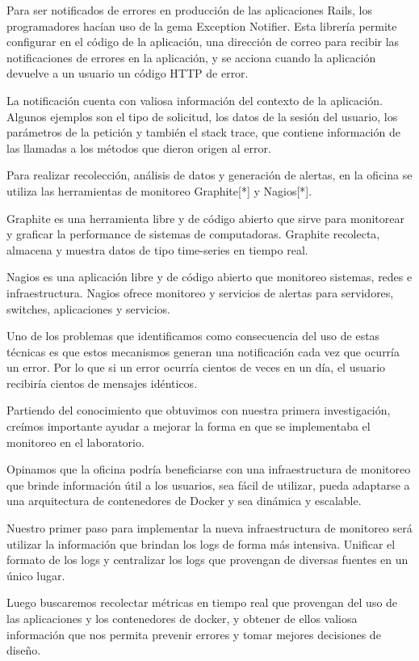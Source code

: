 Para ser notificados de errores en producción de las aplicaciones Rails, los
programadores hacían uso de la gema Exception Notifier. Esta librería permite
configurar en el código de la aplicación, una dirección de correo para recibir
las notificaciones de errores en la aplicación, y se acciona cuando la
aplicación devuelve a un usuario un código HTTP de error.

La notificación cuenta con valiosa información del contexto de la aplicación.
Algunos ejemplos son el tipo de solicitud, los datos de la sesión del usuario,
los parámetros de la petición y también el stack trace, que contiene
información de las llamadas a los métodos que dieron origen al error.

Para realizar recolección, análisis de datos y generación de alertas, en la
oficina se utiliza las herramientas de monitoreo Graphite[*] y Nagios[*].

Graphite es una herramienta libre y de código abierto que sirve para monitorear
y graficar la performance de sistemas de computadoras. Graphite recolecta,
almacena y muestra datos de tipo time-series en tiempo real.

Nagios es una aplicación libre y de código abierto que monitoreo sistemas,
redes e infraestructura. Nagios ofrece monitoreo y servicios de alertas para
servidores, switches, aplicaciones y servicios.

Uno de los problemas que identificamos como consecuencia del uso de estas
técnicas es que estos mecanismos generan una notificación cada vez que ocurría
un error. Por lo que si un error ocurría cientos de veces en un día, el usuario
recibiría cientos de mensajes idénticos.

Partiendo del conocimiento que obtuvimos con nuestra primera investigación,
creímos importante ayudar a mejorar la forma en que se implementaba el
monitoreo en el laboratorio.

Opinamos que la oficina podría beneficiarse con una infraestructura de
monitoreo que brinde información útil a los usuarios, sea fácil de utilizar,
pueda adaptarse a una arquitectura de contenedores de Docker y sea dinámica y
escalable.

Nuestro primer paso para implementar la nueva infraestructura de monitoreo será
utilizar la información que brindan los logs de forma más intensiva. Unificar
el formato de los logs y centralizar los logs que provengan de diversas fuentes
en un único lugar.

Luego buscaremos recolectar métricas en tiempo real que provengan del uso de
las aplicaciones y los contenedores de docker, y obtener de ellos valiosa
información que nos permita prevenir errores y tomar mejores decisiones de
diseño.

